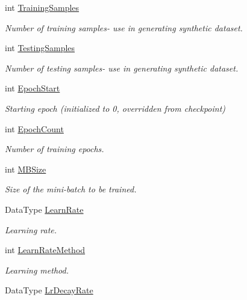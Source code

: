 \begin{DoxyCompactItemize}
int \hyperlink{classlbann_1_1TrainingParams_adf012a044d64191b7d0de8b0278c7060}{Training\+Samples}
\begin{DoxyCompactList}\small\item\em Number of training samples-\/ use in generating synthetic dataset. \end{DoxyCompactList}\item 
int \hyperlink{classlbann_1_1TrainingParams_a7ae1711dab1dc6cce9238b578d198117}{Testing\+Samples}
\begin{DoxyCompactList}\small\item\em Number of testing samples-\/ use in generating synthetic dataset. \end{DoxyCompactList}\item 
int \hyperlink{classlbann_1_1TrainingParams_a2a557658b2a1e66be26d97cfce789635}{Epoch\+Start}
\begin{DoxyCompactList}\small\item\em Starting epoch (initialized to 0, overridden from checkpoint) \end{DoxyCompactList}\item 
int \hyperlink{classlbann_1_1TrainingParams_a0cdfed8e8122f87b2795fb590b821441}{Epoch\+Count}
\begin{DoxyCompactList}\small\item\em Number of training epochs. \end{DoxyCompactList}\item 
int \hyperlink{classlbann_1_1TrainingParams_aeeeaac2fc6b692fa8dbe2faa6c30d73e}{M\+B\+Size}
\begin{DoxyCompactList}\small\item\em Size of the mini-\/batch to be trained. \end{DoxyCompactList}\item 
Data\+Type \hyperlink{classlbann_1_1TrainingParams_a54cca812e7d1e7581c55f221bc49187d}{Learn\+Rate}
\begin{DoxyCompactList}\small\item\em Learning rate. \end{DoxyCompactList}\item 
int \hyperlink{classlbann_1_1TrainingParams_a6f1d673460c793b88c773b97d99e89ee}{Learn\+Rate\+Method}
\begin{DoxyCompactList}\small\item\em Learning method. \end{DoxyCompactList}\item 
Data\+Type \hyperlink{classlbann_1_1TrainingParams_a9be2d1959b1d8a4e04d627a259868dc2}{Lr\+Decay\+Rate}

\end{DoxyCompactItemize}
